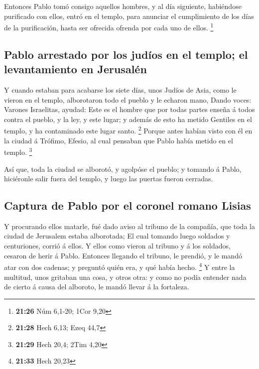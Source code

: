  Entonces Pablo tomó consigo aquellos hombres, y al día
siguiente, habiéndose purificado con ellos, entró en el templo, para
anunciar el cumplimiento de los días de la purificación, hasta ser
ofrecida ofrenda por cada uno de ellos. \footnote{\textbf{21:26} Núm
  6,1-20; 1Cor 9,20}

\hypertarget{pablo-arrestado-por-los-juduxedos-en-el-templo-el-levantamiento-en-jerusaluxe9n}{%
\subsection{Pablo arrestado por los judíos en el templo; el
levantamiento en
Jerusalén}\label{pablo-arrestado-por-los-juduxedos-en-el-templo-el-levantamiento-en-jerusaluxe9n}}

 Y cuando estaban para acabarse los siete días, unos Judíos
de Asia, como le vieron en el templo, alborotaron todo el pueblo y le
echaron mano,  Dando voces: Varones Israelitas, ayudad:
Este es el hombre que por todas partes enseña á todos contra el pueblo,
y la ley, y este lugar; y además de esto ha metido Gentiles en el
templo, y ha contaminado este lugar santo. \footnote{\textbf{21:28} Hech
  6,13; Ezeq 44,7}  Porque antes habían visto con él en la
ciudad á Trófimo, Efesio, al cual pensaban que Pablo había metido en el
templo. \footnote{\textbf{21:29} Hech 20,4; 2Tim 4,20}

 Así que, toda la ciudad se alborotó, y agolpóse el pueblo;
y tomando á Pablo, hiciéronle salir fuera del templo, y luego las
puertas fueron cerradas.

\hypertarget{captura-de-pablo-por-el-coronel-romano-lisias}{%
\subsection{Captura de Pablo por el coronel romano
Lisias}\label{captura-de-pablo-por-el-coronel-romano-lisias}}

 Y procurando ellos matarle, fué dado aviso al tribuno de
la compañía, que toda la ciudad de Jerusalem estaba alborotada;
 El cual tomando luego soldados y centuriones, corrió á
ellos. Y ellos como vieron al tribuno y á los soldados, cesaron de herir
á Pablo.  Entonces llegando el tribuno, le prendió, y le
mandó atar con dos cadenas; y preguntó quién era, y qué había hecho.
\footnote{\textbf{21:33} Hech 20,23}  Y entre la multitud,
unos gritaban una cosa, y otros otra: y como no podía entender nada de
cierto á causa del alboroto, le mandó llevar á la fortaleza.

